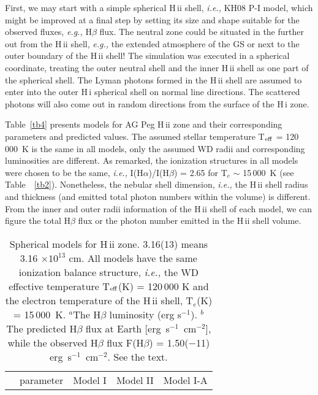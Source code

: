 \documentclass[a4paper,fleqn,usenatbib,useAMS]{mnras}
\def\eg{{\it e.g.,} }
\def\ie{{\it i.e.,} }
\def\ha{H{$\alpha$}}
\def\hb{H{$\beta$}}
\def\hi{H\,{\sc i}}
\def\hii{H\,{\sc ii}}
\begin{document}
{First, we may start with a simple spherical {\hii} shell, \ie KH08 P-I model, which might be improved at a final step by setting its size and shape suitable for the observed fluxes, \eg {\hb} flux. The neutral zone could be situated in the further out from the {\hii} shell, \eg the extended atmosphere of the GS or next to the outer boundary of the {\hii} shell! The simulation was executed in a spherical coordinate, treating the outer neutral shell and the inner {\hii} shell as one part of the spherical shell. The Lyman photons formed in the {\hii} shell are assumed to enter into the outer {\hi} spherical shell  on normal line directions.
The scattered photons will also come out in random directions from the surface of the {\hi} zone.

Table~\ref{tb4} presents models for AG Peg {\hii} zone and their corresponding parameters and predicted values. The assumed stellar temperature T$_{\rm eff}$ = 120\,000~K is the same in all models, only the assumed WD radii and corresponding luminosities are different. As remarked, the ionization structures in all models were chosen to be the same, \ie I({\ha})/I({\hb}) = 2.65 for T$_e$ $\sim$ 15\,000~K (see Table~~\ref{tb2}). Nonetheless, the nebular shell dimension, \ie the {\hii} shell radius and thickness (and emitted total photon numbers within the volume) is different. From the inner and outer radii information of the {\hii} shell of each model, we  can figure the total {\hb} flux or the photon number emitted in the {\hii} shell volume.



\begin{table*}
\caption{Spherical models for {\hii} zone.
3.16(13) means 3.16 $\times 10^{13}$ cm. All models have the same ionization balance structure, \ie the WD effective temperature T$_{\rm eff}$(K) = 120\,000 K and the
electron temperature of the {\hii} shell, T$_e$(K) =  15\,000~K.
$^a$The {\hb} luminosity (erg s$^{-1}$). $^b$The predicted {\hb} flux at Earth [erg~s$^{-1}$~cm$^{-2}$], while the observed {\hb} flux F({\hb}) = 1.50($-$11) erg~s$^{-1}$~cm$^{-2}$.
See the text.}
\vspace{-0.5cm}
\begin{tabular}{llccc}\\
\hline \hline

& parameter & Model I & Model II & Model I-A \\


\end{tabular}
\end{table*}}
\end{document}
